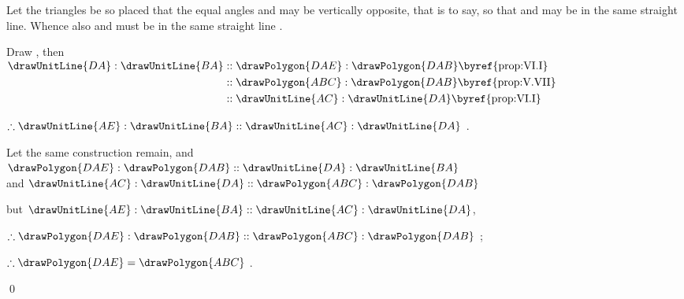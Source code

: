 \documentclass[booklanguage=english]{byrnebook}
\begin{document}
Let the triangles be so placed that the equal angles  and  may be vertically opposite, that is to say, so that  and  may be in the same straight line. Whence also  and  must be in the same straight line .

\begin{center}
Draw , then\\
$\begin{aligned}
\drawUnitLine{DA} : \drawUnitLine{BA}
&:: \drawPolygon{DAE} : \drawPolygon{DAB} \mbox{\byref{prop:VI.I}}\\
&:: \drawPolygon{ABC} : \drawPolygon{DAB} \mbox{\byref{prop:V.VII}}\\
&:: \drawUnitLine{AC} : \drawUnitLine{DA} \mbox{\byref{prop:VI.I}}\\
\end{aligned}$

$\therefore \drawUnitLine{AE} : \drawUnitLine{BA} :: \drawUnitLine{AC} : \drawUnitLine{DA}$ .
\end{center}

\vfill\pagebreak

\begin{center}
Let the same construction remain, and\\
$\drawPolygon{DAE} : \drawPolygon{DAB} :: \drawUnitLine{DA} : \drawUnitLine{BA}$ \\
and $\drawUnitLine{AC} : \drawUnitLine{DA} :: \drawPolygon{ABC} : \drawPolygon{DAB}$ 

but $ \drawUnitLine{AE} : \drawUnitLine{BA} :: \drawUnitLine{AC} : \drawUnitLine{DA}$, \byref{\hypref}

$\therefore \drawPolygon{DAE} : \drawPolygon{DAB} :: \drawPolygon{ABC} : \drawPolygon{DAB}$ ;

$\therefore \drawPolygon{DAE} = \drawPolygon{ABC}$ .
\end{center}

\qed
\end{document}
